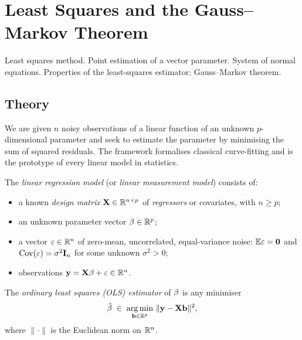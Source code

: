 
\section{Least Squares and the Gauss–Markov Theorem}
\label{sec:1.2.11-least-squares-gauss-markov}

\begin{ticket}
Least squares method. Point estimation of a vector parameter. System of normal equations. Properties of the least-squares estimator; Gauss–Markov theorem.
\end{ticket}

\subsection*{Theory}

We are given $n$ noisy observations of a linear function of an
unknown $p$-dimensional parameter and seek to estimate the parameter
by minimising the sum of squared residuals. The framework formalises
classical curve-fitting and is the prototype of every linear model
in statistics.

\begin{definition}
\label{def:linear-regression-model}
The \emph{linear regression model} (or \emph{linear measurement
model}) consists of:
\begin{itemize}
  \item a known \emph{design matrix} $\mathbf{X} \in \mathbb{R}^{n \times p}$
        of \emph{regressors} or covariates, with $n \geq p$;
  \item an unknown parameter vector $\mathbf{\beta} \in \mathbb{R}^p$;
  \item a vector $\mathbf{\varepsilon} \in \mathbb{R}^n$ of zero-mean,
        uncorrelated, equal-variance noise:
        $\mathbb{E} \mathbf{\varepsilon} = \mathbf{0}$ and
        $\operatorname{Cov}(\mathbf{\varepsilon}) = \sigma^2 \mathbf{I}_n$ for some
        unknown $\sigma^2 > 0$;
  \item observations $\mathbf{y} = \mathbf{X} \mathbf{\beta} + \mathbf{\varepsilon} \in \mathbb{R}^n$.
\end{itemize}
\end{definition}

\begin{definition}
\label{def:ols-estimator}
The \emph{ordinary least squares (OLS) estimator} of
$\mathbf{\beta}$ is any minimiser
\[
  \hat{\mathbf{\beta}} \;\in\; \operatorname*{arg\,min}_{\mathbf{b} \in \mathbb{R}^p}\, \|\mathbf{y} - \mathbf{X} \mathbf{b}\|^2,
\]
where $\|\cdot\|$ is the Euclidean norm on $\mathbb{R}^n$.
\end{definition}

